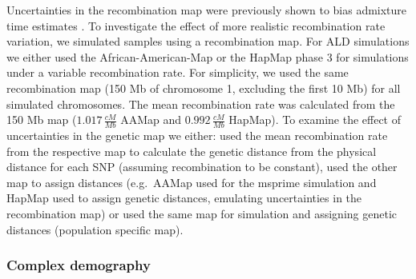\documentclass[]{article}
\begin{document}
Uncertainties in the recombination map were previously shown to bias
admixture time estimates \citep{sankararaman_date_2012,sankararaman_combined_2016,fu_genome_2014}. To investigate the effect of more realistic
recombination rate variation, we simulated samples using a recombination map. For ALD simulations we
either used the African-American-Map \citep{hinch_landscape_2011} or
the HapMap phase 3 \citep{HapMapConsortium_second_2007} for simulations
under a variable recombination rate. For simplicity, we used the same
recombination map (150 Mb of chromosome 1, excluding the first 10 Mb)
for all simulated chromosomes. The mean recombination rate was
calculated from the 150 Mb map (\(1.017 \, \frac{cM}{Mb}\) AAMap and
\(0.992 \, \frac{cM}{Mb}\) HapMap). To examine the effect of uncertainties in the
genetic map we either: used the mean recombination rate from the
respective map to calculate the genetic distance from the physical
distance for each SNP (assuming recombination to be constant), used the other map to assign distances
(e.g.~AAMap used for the msprime simulation and HapMap used to assign
genetic distances, emulating uncertainties in the recombination map) or used the same map for simulation and assigning
genetic distances (population specific map). 

\subsubsection{Complex demography}\label{inferred demography}
\end{document}
